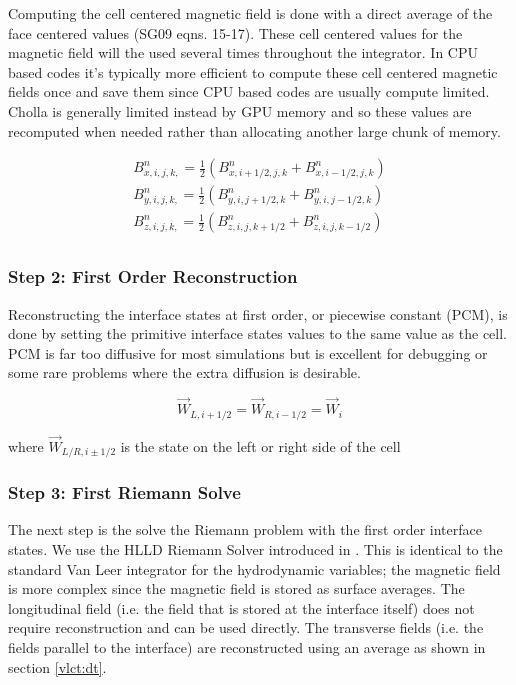 Computing the cell centered magnetic field is done with a direct average of the face centered values (SG09 eqns. 15-17). These cell centered values for the magnetic field will the used several times throughout the integrator. In CPU based codes it's typically more efficient to compute these cell centered magnetic fields once and save them since CPU based codes are usually compute limited. Cholla is generally limited instead by GPU memory and so these values are recomputed when needed rather than allocating another large chunk of memory.

\begin{equation}
    \begin{aligned}
        B^n_{x,i,j,k,} = \frac{1}{2} \left( B^n_{x,i+1/2,j,k} + B^n_{x,i-1/2,j,k} \right) \\
        B^n_{y,i,j,k,} = \frac{1}{2} \left( B^n_{y,i,j+1/2,k} + B^n_{y,i,j-1/2,k} \right) \\
        B^n_{z,i,j,k,} = \frac{1}{2} \left( B^n_{z,i,j,k+1/2} + B^n_{z,i,j,k-1/2} \right) \\
    \end{aligned}
\end{equation}

\subsubsection{Step 2: First Order Reconstruction}
\label{vlct:first-order-reconstruction}

Reconstructing the interface states at first order, or piecewise constant (PCM), is done by setting the primitive interface states values to the same value as the cell. PCM is far too diffusive for most simulations but is excellent for debugging or some rare problems where the extra diffusion is desirable.

\begin{equation}
    \vec{W}_{L, i+1/2} = \vec{W}_{R, i-1/2} = \vec{W}_{i}
\end{equation}

where $ \vec{W}_{L/R, i\pm1/2} $ is the state on the left or right side of the cell

\subsubsection{Step 3: First Riemann Solve}
\label{vlct:first-riemann-solve}

The next step is the solve the Riemann problem with the first order interface states. We use the HLLD Riemann Solver introduced in \cite{hlld_2005}. This is identical to the standard Van Leer integrator for the hydrodynamic variables; the magnetic field is more complex since the magnetic field is stored as surface averages. The longitudinal field (i.e. the field that is stored at the interface itself) does not require reconstruction and can be used directly. The transverse fields (i.e. the fields parallel to the interface) are reconstructed using an average as shown in section \ref{vlct:dt}.

